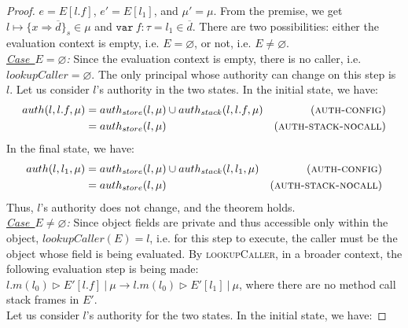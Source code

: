 \documentclass{llncs}
\newcommand{\keywadj}[1]{\mathtt{#1}}
\newcommand{\keyw}[1]{\keywadj{#1}~}
\begin{document}
\begin{proof}
\noindent{}
$e = E[l.f]$, $e' = E[l_1]$, and $\mu' = \mu$. From the premise, we get $l \mapsto \{ x \Rightarrow \overline{d} \}_{s} \in \mu$ and $\keyw{var} f : \tau = l_1 \in \overline{d}$. There are two possibilities: either the evaluation context is empty, i.e. $E = \varnothing$, or not, i.e. $E \not= \varnothing$.\\

\noindent\textit{\mbox{\underline{Case $E = \varnothing$}}:} Since the evaluation context is empty, there is no caller, i.e. $lookupCaller = \varnothing$. The only principal whose authority can change on this step is $l$. Let us consider $l$'s authority in the two states. In the initial state, we have:
\begin{align*}
auth(l, l.f, \mu) &= auth_{store}(l, \mu) \cup auth_{stack}(l, l.f, \mu) & (\textsc{auth-config})\\
&= auth_{store}(l, \mu) & (\textsc{auth-stack-nocall})
\end{align*}
In the final state, we have:
\begin{align*}
auth(l, l_1, \mu) &= auth_{store}(l, \mu) \cup auth_{stack}(l, l_1, \mu) & (\textsc{auth-config})\\
&= auth_{store}(l, \mu) & (\textsc{auth-stack-nocall})
\end{align*}
Thus, $l$'s authority does not change, and the theorem holds.\\

\noindent\textit{\mbox{\underline{Case $E \not= \varnothing$}}:} Since object fields are private and thus accessible only within the object, $lookupCaller(E) = l$, i.e. for this step to execute, the caller must be the object whose field is being evaluated. By \textsc{lookupCaller}, in a broader context, the following evaluation step is being made: \mbox{$l.m(l_0) \rhd E'[l.f]~|~\mu \longrightarrow l.m(l_0) \rhd E'[l_1]~|~\mu$}, where there are no method call stack frames in $E'$.\\

\noindent Let us consider $l$'s authority for the two states. In the initial state, we have:


\end{proof}
\end{document}
